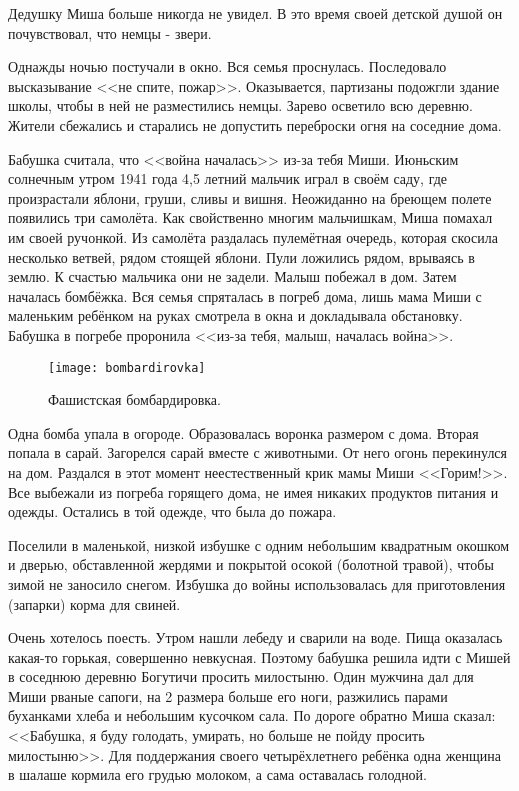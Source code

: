 Дедушку Миша больше никогда не увидел. В это время своей детской душой он почувствовал, что немцы - звери.

Однажды ночью постучали в окно. Вся семья проснулась. Последовало высказывание <<не спите, пожар>>. Оказывается, партизаны подожгли здание школы, чтобы в ней не разместились немцы. Зарево осветило всю деревню. Жители сбежались и старались не допустить переброски огня на соседние дома.

Бабушка считала, что <<война началась>> из-за тебя Миши. Июньским солнечным утром 1941 года 4,5 летний мальчик играл в своём саду, где произрастали яблони, груши, сливы и вишня. Неожиданно на бреющем полете появились три самолёта. Как свойственно многим мальчишкам, Миша помахал им своей ручонкой. Из самолёта раздалась пулемётная очередь, которая скосила несколько ветвей, рядом стоящей яблони. Пули ложились рядом, врываясь в землю. К счастью мальчика они не задели. Малыш побежал в дом. Затем началась бомбёжка. Вся семья спряталась в погреб дома, лишь мама Миши с маленьким ребёнком на руках смотрела в окна и докладывала обстановку. Бабушка в погребе проронила <<из-за тебя, малыш, началась война>>.

\begin{wrapfigure}{O}{.4\textwidth}
\centering
\texttt{[image: bombardirovka]}
\caption{Фашистская бомбардировка.}
\label{fig:bombardirovka}
\end{wrapfigure}

Одна бомба упала в огороде. Образовалась воронка размером с дома. Вторая попала в сарай. Загорелся сарай вместе с животными. От него огонь перекинулся на дом. Раздался в этот момент неестественный крик мамы Миши <<Горим!>>. Все выбежали из погреба горящего дома, не имея никаких продуктов питания и одежды. Остались в той одежде, что была до пожара.

Поселили в маленькой, низкой избушке с одним небольшим квадратным окошком и дверью, обставленной жердями и покрытой осокой (болотной травой), чтобы зимой не заносило снегом. Избушка до войны использовалась для приготовления (запарки) корма для свиней.

Очень хотелось поесть. Утром нашли лебеду и сварили на воде. Пища оказалась какая-то горькая, совершенно невкусная. Поэтому бабушка решила идти с Мишей в соседнюю деревню Богутичи просить милостыню. Один мужчина дал для Миши рваные сапоги, на 2 размера больше его ноги, разжились парами буханками хлеба и небольшим кусочком сала. По дороге обратно Миша сказал: <<Бабушка, я буду голодать, умирать, но больше не пойду просить милостыню>>. Для поддержания своего четырёхлетнего ребёнка одна женщина в шалаше кормила его грудью молоком, а сама оставалась голодной.

